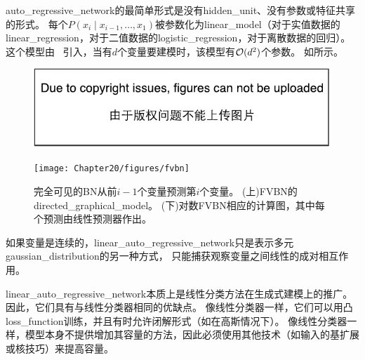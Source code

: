 \gls{auto_regressive_network}的最简单形式是没有\gls{hidden_unit}、没有参数或特征共享的形式。
每个$P(x_i \mid x_{i-1},\dots, x_1)$被参数化为\gls{linear_model}（对于实值数据的\gls{linear_regression}，对于二值数据的\gls{logistic_regression}，对于离散数据的回归）。
这个模型由~\citet{Frey98} 引入，当有$d$个变量要建模时，该模型有$\mathcal{O}(d^2)$个参数。
如所示。

\begin{figure}[!htb]
\ifOpenSource
\centerline{\includegraphics{figure.pdf}}
\else
\centerline{\texttt{[image: Chapter20/figures/fvbn]}}
\fi
\caption{完全可见的\gls{BN}从前$i-1$个变量预测第$i$个变量。
(上)FVBN的\gls{directed_graphical_model}。
(下)对数FVBN相应的计算图，其中每个预测由线性预测器作出。
}
\label{fig:chap20_fvbn}
\end{figure}

如果变量是连续的，\gls{linear_auto_regressive_network}只是表示多元\gls{gaussian_distribution}的另一种方式， 只能捕获观察变量之间线性的成对相互作用。
 
\gls{linear_auto_regressive_network}本质上是线性分类方法在生成式建模上的推广。
因此，它们具有与线性分类器相同的优缺点。
像线性分类器一样，它们可以用凸\gls{loss_function}训练，并且有时允许闭解形式（如在高斯情况下）。
像线性分类器一样，模型本身不提供增加其容量的方法，因此必须使用其他技术（如输入的基扩展或核技巧）来提高容量。


\subsection{}
\label{sec:neural_auto_regressive_networks}

